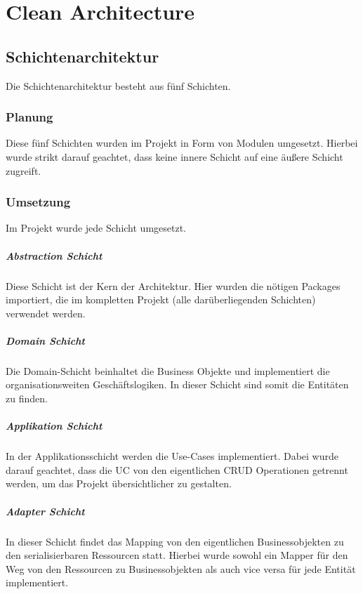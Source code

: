 \chapter{Clean Architecture}

	\section{Schichtenarchitektur}
	Die Schichtenarchitektur besteht aus fünf Schichten. 
		
		\subsection{Planung}
		Diese fünf Schichten wurden im Projekt in Form von Modulen umgesetzt. Hierbei wurde strikt darauf geachtet, dass keine innere Schicht auf eine äußere Schicht zugreift.
	
		\subsection{Umsetzung}
		Im Projekt wurde jede Schicht umgesetzt.
		
			\paragraph{Abstraction Schicht}
			Diese Schicht ist der Kern der Architektur. Hier wurden die nötigen Packages importiert, die im kompletten Projekt (alle darüberliegenden Schichten) verwendet werden.
			
			\paragraph{Domain Schicht}
			Die Domain-Schicht beinhaltet die Business Objekte und implementiert die organisationsweiten Geschäftslogiken. In dieser Schicht sind somit die Entitäten zu finden.
			
			\paragraph{Applikation Schicht}
			In der Applikationsschicht werden die Use-Cases implementiert. Dabei wurde darauf geachtet, dass die UC von den eigentlichen CRUD Operationen getrennt werden, um das Projekt übersichtlicher zu gestalten.
			
			\paragraph{Adapter Schicht}
			In dieser Schicht findet das Mapping von den eigentlichen Businessobjekten zu den serialisierbaren Ressourcen statt. Hierbei wurde sowohl ein Mapper für den Weg von den Ressourcen zu Businessobjekten als auch vice versa für jede Entität implementiert.
			
